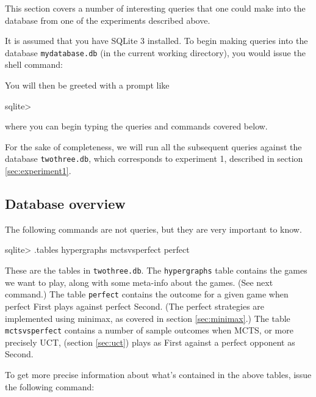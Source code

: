 This section covers a number of interesting queries that one could make into the database from one of the experiments described above.

It is assumed that you have SQLite 3 installed.
To begin making queries into the database \texttt{mydatabase.db} (in the current working directory), you would issue the shell command:
You will then be greeted with a prompt like
\begin{code}
sqlite> 
\end{code}
where you can begin typing the queries and commands covered below.

For the sake of completeness, we will run all the subsequent queries against the database \texttt{twothree.db}, which corresponds to experiment 1, described in section \ref{sec:experiment1}.

\subsection{Database overview}

The following commands are not queries, but they are very important to know.
\begin{code}
sqlite> .tables
hypergraphs    mctsvsperfect  perfect 
\end{code}
These are the tables in \texttt{twothree.db}. The \texttt{hypergraphs} table contains the games we want to play, along with some meta-info about the games. (See next command.)
The table \texttt{perfect} contains the outcome for a given game when perfect First plays against perfect Second. (The perfect strategies are implemented using minimax, as covered in section \ref{sec:minimax}.)
The table \texttt{mctsvsperfect} contains a number of sample outcomes when MCTS, or more precisely UCT, (section \ref{sec:uct}) plays as First against a perfect opponent as Second.

To get more precise information about what's contained in the above tables, issue the following command:

